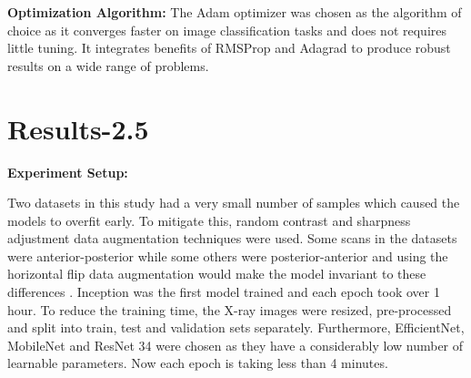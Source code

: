 \documentclass[10pt,twocolumn,letterpaper]{article}
\begin{document}
\textbf{Optimization Algorithm:}
The Adam optimizer \cite{kingma2014adam} was chosen as the algorithm of choice as it converges 
faster on image classification tasks and does not requires little tuning. It integrates benefits of  
RMSProp and Adagrad to produce robust results on a wide range of problems.

\section{Results-2.5} 
\label{sec:method}
\textbf{Experiment Setup:}

Two datasets in this study had a very small number of samples which caused the models to 
overfit early. To mitigate this, random contrast and sharpness adjustment 
\cite{nanni2021comparison} data augmentation techniques were used. Some scans in the 
datasets were anterior-posterior while some others were posterior-anterior and using the 
horizontal flip data augmentation would make the model invariant to these differences
\cite{botev2022regularising}.
Inception was the first model trained and each epoch took over 1 hour. To reduce the 
training time, the X-ray images were resized, pre-processed and split into train, test and 
validation sets separately. Furthermore, EfficientNet, MobileNet and ResNet 34 were chosen 
as they have a considerably low number of learnable parameters. Now each epoch is taking 
less than 4 minutes. 
\end{document}
